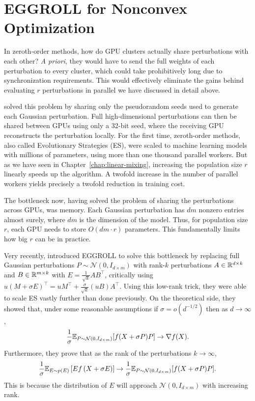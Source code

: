 
\chapter[EGGROLL for Nonconvex Optimization]
{EGGROLL for Nonconvex Optimization}
\label{chap:fosp-eggroll}
In zeroth-order methods, how do GPU clusters actually share perturbations with each other? \textit{A priori}, they would have to send the full weights of each perturbation to every cluster, which could take prohibitively long due to synchronization requirements. This would effectively eliminate the gains behind evaluating $r$ perturbations in parallel we have discussed in detail above.

\citet{salimans2017evolution} solved this problem by sharing only the pseudorandom seeds used to generate each Gaussian perturbation. Full high-dimensional perturbations can then be shared between GPUs using only a 32-bit seed, where the receiving GPU reconstructs the perturbation locally. For the first time, zeroth-order methods, also called Evolutionary Strategies (ES), were scaled to machine learning models with millions of parameters, using more than one thousand parallel workers. But as we have seen in Chapter~\ref{chap:linear-mixing}, increasing the population size $r$ linearly speeds up the algorithm. A twofold increase in the number of parallel workers yields precisely a twofold reduction in training cost. 

The bottleneck now, having solved the problem of sharing the perturbations across GPUs, was memory. Each Gaussian perturbation has $dm$ nonzero entries almost surely, where $dm$ is the dimension of the model. Thus, for population size $r$, each GPU needs to store $O(dm \cdot r)$ parameters. This fundamentally limits how big $r$ can be in practice. 

Very recently, \citet{sarkar2025evolution} introduced EGGROLL to solve this bottleneck by replacing full Gaussian perturbations $P \sim \mathcal N(0, I_{d \times m})$ with rank-$k$ perturbations $A \in \mathbb{R}^{d \times k}$ and $B \in \mathbb{R}^{m \times k}$ with $E = \frac{1}{\sqrt{k}} AB^\top$, critically using $u(M+\sigma E)^\top = uM^\top + \frac{\sigma}{\sqrt{k}} (uB) A^\top$. Using this low-rank trick, they were able to scale ES vastly further than done previously. On the theoretical side, they showed that, under some reasonable assumptions if $\sigma = o(d^{-1/2})$ then as $d \to \infty$,
\begin{align*}
    \frac{1}{\sigma}\mathbb{E}_{P \sim \mathcal N(0,I_{d\times m})}[f(X+\sigma P)P] \to \nabla f(X).
\end{align*}
Furthermore, they prove that as the rank of the perturbations $k\to\infty$, 
\begin{align*}
    \frac{1}{\sigma} \mathbb{E}_{E \sim p(E)}\left[E f\left(X + \sigma E\right)\right] \to \frac{1}{\sigma}\mathbb{E}_{P \sim \mathcal N(0,I_{d \times m})}[f(X+\sigma P)P].
\end{align*}
This is because the distribution of $E$ will approach $\mathcal N(0, I_{d \times m})$ with increasing rank. 

